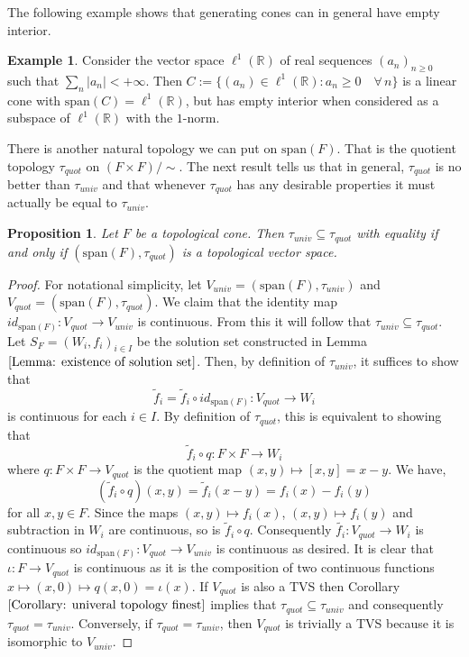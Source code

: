 \documentclass[a4paper,11pt]{article}
\numberwithin{equation}{section}
\theoremstyle{definition}
\newtheorem{Example}[Definition]{Example}
\theoremstyle{plain}
\newtheorem{Proposition}[Definition]{Proposition}
\newcommand{\R}{\mathbb R}
\newcommand{\spn}{\mathrm{span}}
\begin{document}
The following example shows that generating cones can in general have empty interior.

\begin{Example}
    Consider the vector space $\ell^1(\R)$ of real sequences $(a_n)_{n \geq 0}$ such that $\sum_n |a_n| < + \infty$. Then $C:=\{(a_n) \in \ell^1(\R) : a_n \geq 0 \quad \forall \, n\}$ is a linear cone with $\spn(C) = \ell^1(\R)$, but has empty interior when considered as a subspace of $\ell^1(\R)$ with the $1$-norm.
\end{Example}

There is another natural topology we can put on $\spn(F)$. That is the quotient topology $\tau_{quot}$ on $(F \times F)/\sim$. The next result tells us that in general, $\tau_{quot}$ is no better than $\tau_{univ}$ and that whenever $\tau_{quot}$ has any desirable properties it must actually be equal to $\tau_{univ}$.

\begin{Proposition}\label{prop: quot topology too fine}
    Let $F$ be a topological cone. Then $\tau_{univ} \subseteq \tau_{quot}$ with equality if and only if $(\spn(F), \tau_{quot})$ is a topological vector space.
\end{Proposition}
\begin{proof}
    For notational simplicity, let $V_{univ} = (\spn(F), \tau_{univ})$ and $V_{quot} = (\spn(F), \tau_{quot})$. We claim that the identity map $id_{\spn(F)}: V_{quot} \longrightarrow V_{univ}$ is continuous. From this it will follow that $\tau_{univ} \subseteq \tau_{quot}$. Let $S_{F} = (W_{i}, f_{i})_{i \in I}$ be the solution set constructed in Lemma $\ref{Lemma: existence of solution set}$. Then, by definition of $\tau_{univ}$, it suffices to show that
    $$\tilde{f}_{i} =  \tilde{f}_{i} \circ id_{\spn(F)}: V_{quot} \longrightarrow W_{i}$$
    is continuous for each $i \in I$. By definition of $\tau_{quot}$, this is equivalent to showing that 
    $$\tilde{f}_{i} \circ q: F \times F \longrightarrow W_{i}$$
    where $q: F \times F \longrightarrow V_{quot}$ is the quotient map $(x, y) \mapsto [x, y] = x - y$. We have,
    $$(\tilde{f}_{i}\circ q)(x, y) = \tilde{f}_{i}(x - y) = f_{i}(x) - f_{i}(y)$$
    for all $x, y \in F$.
    Since the maps $(x, y) \mapsto f_i(x)$, $(x, y) \mapsto f_{i}(y)$ and subtraction in $W_{i}$ are continuous, so is $\tilde{f}_{i} \circ q$. Consequently $\tilde{f_{i}}: V_{quot} \longrightarrow W_{i}$ is continuous so $id_{\spn(F)}: V_{quot} \longrightarrow V_{univ}$ is continuous as desired. It is clear that $\iota: F \longrightarrow V_{quot}$ is continuous as it is the composition of two continuous functions $x \mapsto (x, 0) \mapsto q(x, 0) = \iota(x)$. If $V_{quot}$ is also a TVS then Corollary $\ref{Corollary: univeral topology finest}$ implies that $\tau_{quot} \subseteq \tau_{univ}$ and consequently $\tau_{quot} = \tau_{univ}$. Conversely, if $\tau_{quot} = \tau_{univ}$, then $V_{quot}$ is trivially a TVS because it is isomorphic to $V_{univ}$.
\end{proof}
\end{document}
